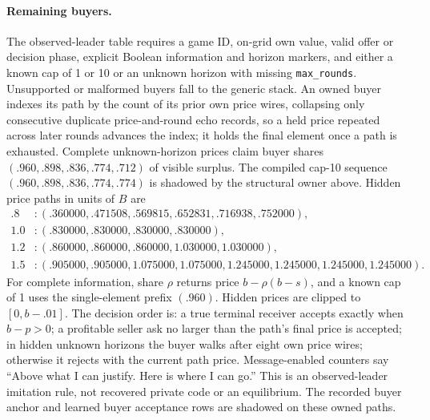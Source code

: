 \paragraph{Remaining buyers.}
The observed-leader table requires a game ID, on-grid own value, valid offer or
decision phase, explicit Boolean information and horizon markers, and either a
known cap of 1 or 10 or an unknown horizon with missing \texttt{max\_rounds}.
Unsupported or malformed buyers fall to the generic stack. An owned buyer
indexes its path by the count of its prior own price wires, collapsing only
consecutive duplicate price-and-round echo records, so a held price repeated
across later rounds advances the index; it holds the final element once a
path is exhausted. Complete unknown-horizon prices claim buyer shares
$(.960,.898,.836,.774,.712)$ of visible surplus. The compiled cap-10 sequence
$(.960,.898,.836,.774,.774)$ is shadowed by the structural owner above. Hidden
price paths in units of $B$ are
\begin{align*}
.8 &: (.360000,.471508,.569815,.652831,.716938,.752000),\\
1.0 &: (.830000,.830000,.830000,.830000),\\
1.2 &: (.860000,.860000,.860000,1.030000,1.030000),\\
1.5 &: (.905000,.905000,1.075000,1.075000,1.245000,1.245000,1.245000,1.245000).
\end{align*}
For complete information, share $\rho$ returns price $b-\rho(b-s)$, and a
known cap of 1 uses the single-element prefix $(.960)$. Hidden prices are
clipped to $[0,b-.01]$. The decision order is: a true terminal receiver
accepts exactly when $b-p>0$; a profitable seller ask no larger than the
path's final price is accepted; in hidden unknown horizons the buyer walks
after eight own price wires; otherwise it rejects with the current path price.
Message-enabled counters say ``Above what I can justify. Here is where I can
go.'' This is an observed-leader imitation rule, not recovered private code or
an equilibrium. The recorded buyer anchor and learned buyer acceptance rows
are shadowed on these owned paths.


